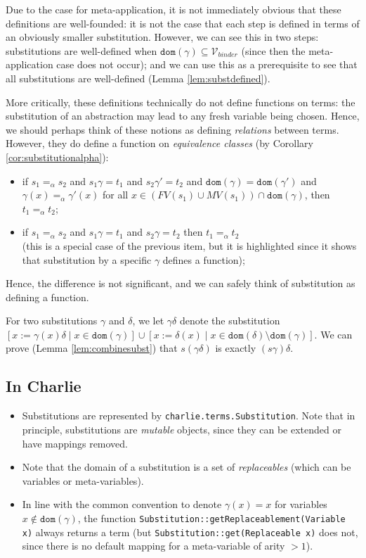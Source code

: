 \documentclass{lmcs}
\theoremstyle{theorem}\newtheorem{theorem}{Theorem}
\theoremstyle{theorem}\newtheorem{lemma}[theorem]{Lemma}
\theoremstyle{theorem}\newtheorem{corollary}[theorem]{Corollary}
\theoremstyle{definition}\newtheorem{definition}[theorem]{Definition}
\theoremstyle{definition}\newtheorem{example}[theorem]{Example}
\newcommand{\Vbound}{\mathcal{V}_{\mathit{binder}}}
\newcommand{\FV}{\mathit{FV}}
\newcommand{\FMV}{\mathit{MV}}
\newcommand{\domain}{\mathtt{dom}}
\newcommand{\avar}{x}
\begin{document}
Due to the case for meta-application, it is not immediately obvious that these
definitions are well-founded: it is not the case that each step is defined in
terms of an obviously smaller substitution.  However, we can see this in two
steps: substitutions are well-defined when $\domain(\gamma) \subseteq \Vbound$
(since then the meta-application case does not occur); and we can use this as a
prerequisite to see that all substitutions are well-defined (Lemma
\ref{lem:substdefined}).

More critically, these definitions technically do not define functions on terms:
the substitution of an abstraction may lead to any fresh variable being chosen.
Hence, we should perhaps think of these notions as defining \emph{relations}
between terms.  However, they do define a function on \emph{equivalence classes}
(by Corollary \ref{cor:substitutionalpha}):
\begin{itemize}
\item if $s_1 =_\alpha s_2$ and $s_1\gamma = t_1$ and $s_2\gamma' = t_2$ and
  $\domain(\gamma) = \domain(\gamma')$ and
  $\gamma(x) =_\alpha \gamma'(x)$ for all $x \in (\FV(s_1) \cup \FMV(s_1)) \cap
  \domain(\gamma)$, then $t_1 =_\alpha t_2$;
\item if $s_1 =_\alpha s_2$ and $s_1\gamma = t_1$ and $s_2\gamma = t_2$ then
  $t_1 =_\alpha t_2$ \\
  (this is a special case of the previous item, but it is highlighted since it
  shows that substitution by a specific $\gamma$ defines a function);
\end{itemize}
Hence, the difference is not significant, and we can safely think of
substitution as defining a function.

For two substitutions $\gamma$ and $\delta$, we let $\gamma\delta$ denote the
substitution $[\avar := \gamma(\avar)\delta \mid \avar \in \domain(\gamma)] \cup
[\avar := \delta(\avar) \mid \avar \in \domain(\delta) \setminus
\domain(\gamma)]$.
We can prove (Lemma \ref{lem:combinesubst}) that $s(\gamma\delta)$ is exactly
$(s\gamma)\delta$.

\subsection*{In Charlie}

\begin{itemize}
\item Substitutions are represented by \texttt{charlie.terms.Substitution}.
  Note that in principle, substitutions are \emph{mutable} objects, since they
  can be extended or have mappings removed.
\item Note that the domain of a substitution is a set of \emph{replaceables}
  (which can be variables or meta-variables).
\item In line with the common convention to denote $\gamma(\avar) = \avar$ for
  variables $\avar \notin \domain(\gamma)$, the function
  \texttt{Substitution::getReplaceablement(Variable x)} always returns a term
  (but \texttt{Substitution::get(Replaceable x)} does not, since there is no
  default mapping for a meta-variable of arity $> 1$).
\end{itemize}
\end{document}

